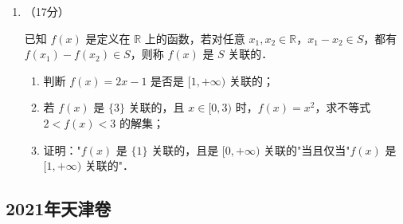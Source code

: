 \begin{description}
\begin{enumerate}[leftmargin=5pt]
        \begin{enumerate}[label=(\arabic*)]
            \item 求 $\Gamma$ 的离心率；
            \item 过 $F_2$ 作 $\angle F_1PF_2$ 的外角平分线的垂线，求垂足 $Q$ 的轨迹方程；
            \item 设 $A$ 为椭圆的右顶点，是否存在 $y$ 轴上的定点 $M$，使得以 $PA$ 为直径的圆恒过定点 $M$？若存在，求出 $M$，若不存在，说明理由．
        \end{enumerate}

        \item （17分）

        已知 $f(x)$ 是定义在 $\mathbb{R}$ 上的函数，若对任意 $x_1,x_2\in\mathbb{R}$，$x_1-x_2\in S$，都有 $f(x_1)-f(x_2)\in S$，则称 $f(x)$ 是 $S$ 关联的．

        \begin{enumerate}[label=(\arabic*)]
            \item 判断 $f(x)=2x-1$ 是否是 $[1,+\infty)$ 关联的；
            \item 若 $f(x)$ 是 $\{3\}$ 关联的，且 $x\in[0,3)$ 时，$f(x)=x^2$，求不等式 $2<f(x)<3$ 的解集；
            \item 证明："$f(x)$ 是 $\{1\}$ 关联的，且是 $[0,+\infty)$ 关联的"当且仅当"$f(x)$ 是 $[1,+\infty)$ 关联的"．
        \end{enumerate}
    \end{enumerate}
\end{description}
\clearpage


\subsection{2021年天津卷}\label{gk:2021年天津卷}


